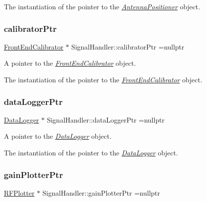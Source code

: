 The instantiation of the pointer to the {\itshape \hyperlink{classAntennaPositioner}{Antenna\+Positioner}} object. \mbox{\label{classSignalHandler_ae5bbe309adfefeb3b7e9ebf31d32b763}} 
\subsubsection{\texorpdfstring{calibrator\+Ptr}{calibratorPtr}}
{\footnotesize\ttfamily \hyperlink{classFrontEndCalibrator}{Front\+End\+Calibrator} $\ast$ Signal\+Handler\+::calibrator\+Ptr =nullptr\hspace{0.3cm}{\ttfamily [static]}}



A pointer to the {\itshape \hyperlink{classFrontEndCalibrator}{Front\+End\+Calibrator}} object. 

The instantiation of the pointer to the {\itshape \hyperlink{classFrontEndCalibrator}{Front\+End\+Calibrator}} object. \mbox{\label{classSignalHandler_a114e600bdc2ad95efbc2991c97f3732c}} 
\subsubsection{\texorpdfstring{data\+Logger\+Ptr}{dataLoggerPtr}}
{\footnotesize\ttfamily \hyperlink{classDataLogger}{Data\+Logger} $\ast$ Signal\+Handler\+::data\+Logger\+Ptr =nullptr\hspace{0.3cm}{\ttfamily [static]}}



A pointer to the {\itshape \hyperlink{classDataLogger}{Data\+Logger}} object. 

The instantiation of the pointer to the {\itshape \hyperlink{classDataLogger}{Data\+Logger}} object. \mbox{\label{classSignalHandler_a040fa3711d4239933dd28a00b24965b2}} 
\subsubsection{\texorpdfstring{gain\+Plotter\+Ptr}{gainPlotterPtr}}
{\footnotesize\ttfamily \hyperlink{classRFPlotter}{R\+F\+Plotter} $\ast$ Signal\+Handler\+::gain\+Plotter\+Ptr =nullptr\hspace{0.3cm}{\ttfamily [static]}}



